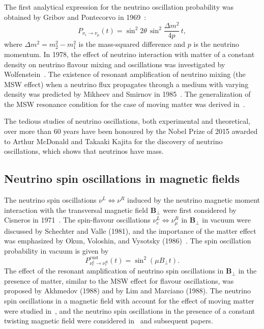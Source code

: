 \documentclass[a4paper,11pt]{article}
\begin{document}
The first analytical expression for the neutrino oscillation probability was obtained by Gribov and Pontecorvo in 1969~\cite{Gribov:Pontecorvo:1969}:
\begin{equation}
\label{eq:P_GP}
P_{\nu_e \to \nu_\mu}(t) = \sin^2 2\theta\,\sin^2\frac{\Delta m^2}{4p}\,t,
\end{equation}
where $\Delta m^2 = m_2^2 - m_1^2$ is the mass-squared difference and $p$ is the neutrino momentum. In 1978, the effect of neutrino interaction with matter of a constant density on neutrino flavour mixing and oscillations was investigated by Wolfenstein~\cite{Wolfenstein:1978}. The existence of resonant amplification of neutrino mixing (the MSW effect) when a neutrino flux propagates through a medium with varying density was predicted by Mikheev and Smirnov in 1985~\cite{Mikheev:Smirnov:1985}. The generalization of the MSW resonance condition for the case of moving matter was derived in~\cite{Grigoriev:Lobanov:Studenikin:2002PLB}.

The tedious studies of neutrino oscillations, both experimental and theoretical, over more than 60 years have been honoured by the Nobel Prize of 2015 awarded to Arthur McDonald and Takaaki Kajita for the discovery of neutrino oscillations, which shows that neutrinos have mass.

\subsection{Neutrino spin oscillations in magnetic fields}

The neutrino spin oscillations $\nu^L \Leftrightarrow \nu^R$ induced by the neutrino magnetic moment interaction with the transversal magnetic field $\mathbf{B}_\perp$ were first considered by Cisneros in 1971~\cite{Cisneros:1971}. The spin-flavour oscillations $\nu_e^L \Leftrightarrow \nu_\mu^R$ in $\mathbf{B}_\perp$ in vacuum were discussed by Schechter and Valle (1981), and the importance of the matter effect was emphasized by Okun, Voloshin, and Vysotsky (1986)~\cite{Okun:1986}. The spin oscillation probability in vacuum is given by
\begin{equation}
P_{\nu_e^L \to \nu_e^R}^{\text{cust}}(t) = \sin^2(\mu B_\perp t).
\end{equation}
The effect of the resonant amplification of neutrino spin oscillations in $\mathbf{B}_\perp$ in the presence of matter, similar to the MSW effect for flavour oscillations, was proposed by Akhmedov (1988) and by Lim and Marciano (1988). The neutrino spin oscillations in a magnetic field with account for the effect of moving matter were studied in~\cite{Lobanov:Studenikin:2001PLB}, and the neutrino spin oscillations in the presence of a constant twisting magnetic field were considered in~\cite{Lobanov:Studenikin:2001PLB} and subsequent papers.
\end{document}
